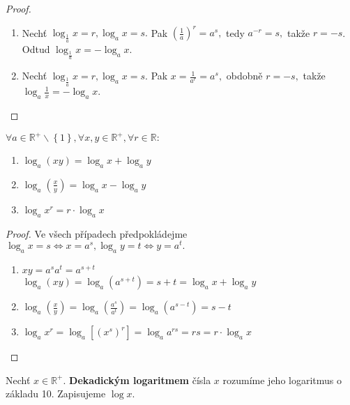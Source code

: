 \begin{proof}
    \begin{enumerate}[$i.$]
        \item Nechť $\log_{\frac{1}{a}} x = r, \log_a x = s.$ Pak
        $\left ( \frac{1}{a} \right )^r = a^s,$ tedy $a^{-r}=s,$ takže $r=-s$.
        Odtud $\log_{\frac{1}{a}} x = -\log_a x.$
       	\item Nechť $\log_{\frac{1}{a}} x = r, \log_a x = s.$ Pak
        $x = \frac{1}{a^r}=a^s,$ obdobně $r=-s,$ takže $\log_a \frac{1}{x}=
        -\log_a x.$\qedhere
    \end{enumerate}
\end{proof}

\begin{veta}
    $\forall a \in \mathbb R^+ \smallsetminus \left \{ 1 \right \}, \forall x,y \in \mathbb R^+
    ,\forall r \in \mathbb R:$
    \begin{enumerate}[$i.$]
        \item $\log_a (xy)=\log_a x + \log_a y$
       	\item $\log_a \left ( \frac{x}{y} \right ) = \log_a x - \log_a y $
       	\item $\log_a x^r = r\cdot \log_a x$
    \end{enumerate}
\end{veta}

\begin{proof}
    Ve všech případech předpokládejme $\log_a x = s \iff x = a^s,
    \log_a y = t \iff y = a^t.$
    \begin{enumerate}[$i.$]
        \item $xy = a^sa^t=a^{s+t}$\\
        $\log_a (xy) = \log_a (a^{s+t}) = s+t=\log_a x + \log_a y$
       	\item $\log_a \left ( \frac{x}{y} \right )  = \log_a
        \left ( \frac{a^s}{a^t} \right ) =\log_a \left ( a^{s-t} \right ) =
        s-t $
       	\item $\log_a x^r = \log_a \left [ \left ( x^s \right )^r  \right ] =
        \log_a a^{rs}=rs=r\cdot \log_a x$\qedhere
    \end{enumerate}
\end{proof}

\begin{definition}
    Nechť $x\in \mathbb R^+.$ \textbf{Dekadickým logaritmem} čísla $x$ rozumíme
    jeho logaritmus o základu 10. Zapisujeme $\log x.$
\end{definition}

